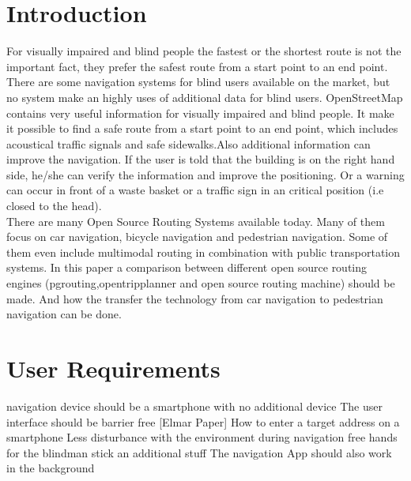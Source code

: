 \documentclass{sig-alternate}
\begin{document}

\section{Introduction}
For visually impaired and blind people the fastest or the shortest route is not the important fact, they prefer the safest route from a start point to an end point. There are some navigation systems for blind users available on the market, but no system make an highly uses of additional data for blind users. 
OpenStreetMap contains very useful information for visually impaired and blind people. It make it possible to find a safe route from a start point to an end point, which includes acoustical traffic signals and safe sidewalks.Also additional information can improve the navigation. If the user is told that the building is on the right hand side, he/she can verify the information and improve the positioning. Or a warning can occur in front of a waste basket or a traffic sign in an critical position (i.e closed to the head). \\
 
There are many Open Source Routing Systems available today. Many of them focus on car navigation, bicycle navigation and pedestrian navigation. Some of them even include multimodal routing in combination with public transportation systems. In this paper a comparison between different open source routing engines (pgrouting,opentripplanner and open source routing machine) should be made. And how the transfer the technology from car navigation to pedestrian navigation can be done. 
\section{User Requirements}
navigation device should be a smartphone with no additional device
The user interface should be barrier free [Elmar Paper]
How to enter a target address on a smartphone
Less disturbance with the environment
during navigation free hands for the blindman stick an additional stuff
The navigation App should also work in the background
\end{document}
